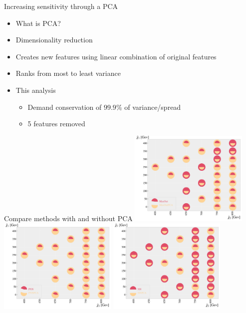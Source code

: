 \documentclass[UKenglish]{beamer}
\begin{document}
\begin{frame}{Increasing sensitivity through a PCA}
        \begin{itemize}
            \item What is PCA?
            \item Dimensionality reduction
            \item Creates new features using linear combination of original features
            \item Ranks from most to least variance
            \item This analysis
            \begin{itemize}
                \item Demand conservation of $99.9\%$ of variance/spread
                \item 5 features removed
            \end{itemize}
        \end{itemize}
\end{frame}
\begin{frame}{Compare methods with and without PCA}
    \centering
    \includegraphics[width=0.425\textwidth]{figures/Comps/MaxOutPCANetworkComp.pdf}
    \includegraphics[width=0.425\textwidth]{figures/Comps/PNNPCANetworkComp.pdf}
    \includegraphics[width=0.425\textwidth]{figures/Comps/NNPCANetworkComp.pdf}

\end{frame}
\end{document}
